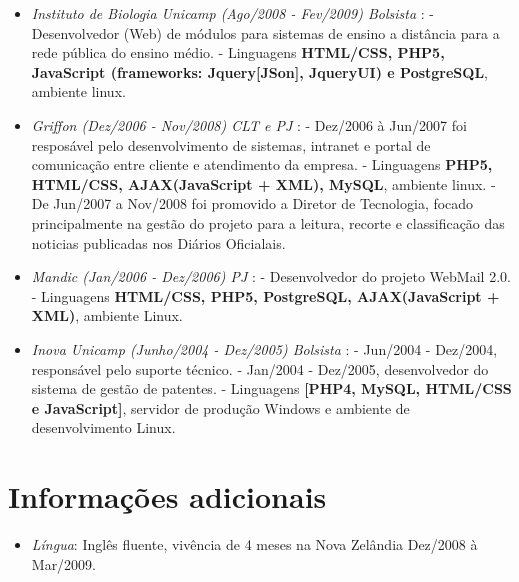 \documentclass[a4paper,10pt]{article}
\begin{document}
\begin{itemize}
\item \emph{Instituto de Biologia Unicamp (Ago/2008 - Fev/2009) Bolsista }: 
  \subitem - Desenvolvedor (Web) de módulos para sistemas de ensino a distância para a rede pública do ensino médio.
  \subitem - Linguagens \textbf{HTML/CSS, PHP5, JavaScript (frameworks: Jquery[JSon], JqueryUI) e PostgreSQL}, ambiente linux.

\item \emph{Griffon (Dez/2006 - Nov/2008) CLT e PJ }: 
  \subitem - Dez/2006 à Jun/2007 foi resposável pelo desenvolvimento de sistemas, intranet e portal de comunicação entre cliente e atendimento da empresa. 
  \subitem - Linguagens \textbf{PHP5, HTML/CSS, AJAX(JavaScript + XML), MySQL}, ambiente linux.
  \subitem - De Jun/2007 a Nov/2008 foi promovido a Diretor de Tecnologia, focado principalmente na gestão do projeto para a leitura, recorte e classificação das noticias publicadas nos Diários Oficialais. 

\item \emph{Mandic (Jan/2006 - Dez/2006) PJ }: 
  \subitem - Desenvolvedor do projeto WebMail 2.0. 
  \subitem - Linguagens \textbf{HTML/CSS, PHP5, PostgreSQL, AJAX(JavaScript + XML)}, ambiente Linux.
  
\item \emph{Inova Unicamp (Junho/2004 - Dez/2005) Bolsista }: 
  \subitem - Jun/2004 - Dez/2004, responsável pelo suporte técnico.
  \subitem - Jan/2004 - Dez/2005, desenvolvedor do sistema de gestão de patentes.
  \subitem - Linguagens \textbf{[PHP4, MySQL, HTML/CSS e JavaScript]}, servidor de produção Windows e ambiente de desenvolvimento Linux.

\end{itemize}
\section{Informações adicionais}
\begin{itemize}
\item \emph{Língua}: Inglês fluente, vivência de 4 meses na Nova Zelândia Dez/2008 à Mar/2009.
\end{itemize}
\end{document}
